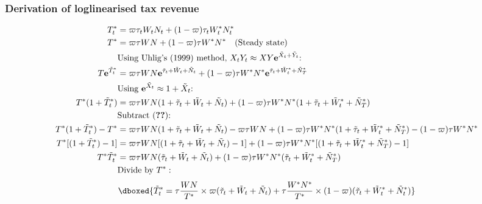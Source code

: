 \subsubsection*{Derivation of loglinearised tax revenue}
\begin{align*}
    T^*_t &= \varpi\tau_t W_t N_t + (1-\varpi)\tau_t W^*_t N^*_t \\
    T^* &= \varpi\tau W N + (1-\varpi)\tau W^* N^* \quad \text{(Steady state)}\\
    &\text{Using Uhlig's (1999) method, $X_tY_t \approx XY\mathbf{e}^{\tilde{X}_t + \tilde{Y}_t}$: }\nonumber\\
    T\mathbf{e}^{\tilde{T}^*_t} &= \varpi \tau W N \mathbf{e}^{\tilde{\tau}_t+\tilde{W}_t+\tilde{N}_t} + (1-\varpi) \tau W^* N^* \mathbf{e}^{\tilde{\tau}_t+\tilde{W}^*_t+\tilde{N}^*_T} \\
    &\text{Using $\mathbf{e}^{\tilde{X}_t} \approx 1 + {\tilde{X}_t}$: }\nonumber\\
    T^* (1 + {\tilde{T}^*_t}) &= \varpi \tau W N (1 + {\tilde{\tau}_t+\tilde{W}_t+\tilde{N}_t}) + (1-\varpi) \tau W^* N^* (1 + {\tilde{\tau}_t+\tilde{W}^*_t+\tilde{N}^*_T}) \\
    &\text{Subtract (\textbf{??}): } \nonumber\\
    T^* (1 + {\tilde{T}^*_t}) - T^* &= \varpi \tau W N (1 + {\tilde{\tau}_t+\tilde{W}_t+\tilde{N}_t}) - \varpi\tau W N + (1-\varpi) \tau W^* N^* (1 + {\tilde{\tau}_t+\tilde{W}^*_t+\tilde{N}^*_T}) - (1-\varpi)\tau W^* N^* \\
    T^*[(1 + {\tilde{T}^*_t}) - 1] &= \varpi \tau W N [(1 + {\tilde{\tau}_t+\tilde{W}_t+\tilde{N}_t}) - 1] + (1-\varpi) \tau W^* N^* [(1 + {\tilde{\tau}_t+\tilde{W}^*_t+\tilde{N}^*_T}) - 1] \\
    T^*\tilde{T}^*_t &= \varpi \tau W N (\tilde{\tau}_t + \tilde{W}_t + \tilde{N}_t) + (1-\varpi) \tau W^* N^* (\tilde{\tau}_t+\tilde{W}^*_t+\tilde{N}^*_T) \\
    &\text{Divide by $T^*$}:\nonumber
\end{align*}
\begin{equation}
    \dboxed{\tilde{T}^*_t = \tau\frac{ W N}{T^*}\times \varpi (\tilde{\tau}_t + \tilde{W}_t + \tilde{N}_t) + \tau \frac{ W^* N^*}{T^*} \times (1-\varpi) (\tilde{\tau}_t+\tilde{W}^*_t+\tilde{N}^*_t)}
\end{equation}
\newpage